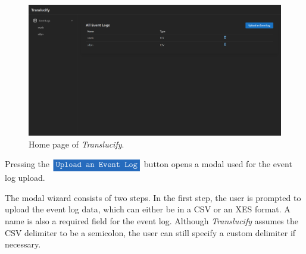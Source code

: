 \begin{figure}
    \centering
    \includegraphics[width=\textwidth]{figures/screenshots/home.png}
    \caption{Home page of \emph{Translucify}.}
    \label{fig:home-page}
\end{figure}

Pressing the $\colorbox{NavyBlue}{\textcolor{white}{\texttt{Upload an Event Log}}}$ button opens a modal used for the event log upload.

The modal wizard consists of two steps. In the first step, the user is prompted to upload the event log data, which can either be in a CSV or an XES format. A name is also a required field for the event log. Although \emph{Translucify} assumes the CSV delimiter to be a semicolon, the user can still specify a custom delimiter if necessary.




